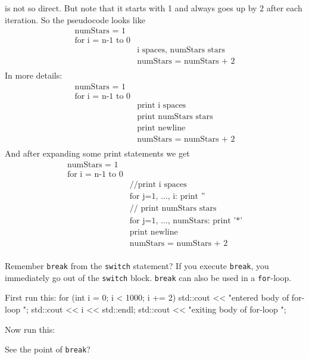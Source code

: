 \begin{console}
\begin{ex}
is not so direct. But note that it starts with 1 and always goes up by 2
after each iteration. So the pseudocode looks like
\begin{align*}     
      \text{numStars = 1}\\
      \text{for i = n-1 to 0}\\
&              \text{i spaces, numStars stars}\\
&              \text{numStars = numStars + 2}\\
\end{align*}
In more details:
\begin{align*}
      \text{numStars = 1}\\
      \text{for i = n-1 to 0}\\
&          \text{print i spaces}\\
&          \text{print numStars stars}\\
&          \text{print newline}\\
&          \text{numStars = numStars + 2}\\
\end{align*}
And after expanding some print statements we get
\begin{align*}
      \text{numStars = 1}\\
      \text{for i = n-1 to 0}\\
&            \text{//print i spaces}\\
&            \text{for j=1, \ldots, i: print ''}\\
&            \text{// print numStars stars}\\
&            \text{for j=1, \ldots, numStars: print '*'}\\
&            \text{print newline}\\
&            \text{numStars = numStars + 2}\\
\end{align*}
\end{ex}
\newpage{}

Remember \texttt{break} from the \texttt{switch} statement? If you execute
\texttt{break}, you immediately go out of the \texttt{switch} block.
\texttt{break} can also be used in a \texttt{for}-loop.
\begin{console}
First run this:
for (int i = 0; i < 1000; i += 2)
{
std::cout << "entered body of for-loop \n";
std::cout << i << std::endl;
std::cout << "exiting body of for-loop \n";
} 
\end{console}
Now run this:
See the point of \texttt{break}?


\end{console}
